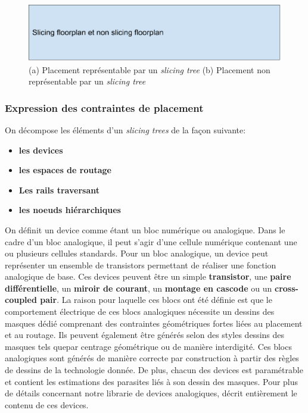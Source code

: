 \begin{figure}[h]
\begin{center}
\includegraphics[height=0.10\textheight]{Figures/10.pdf}
\caption{(a) Placement représentable par un \textit{slicing tree} (b) Placement non représentable par un \textit{slicing tree}}
\label{fig:10}
\end{center}
\end{figure} 
\subsubsection{Expression des contraintes de placement}
On décompose les éléments d'un \textit{slicing trees} de la façon suivante:
\begin{itemize}
\item \textbf{les devices}
\item \textbf{les espaces de routage}
\item \textbf{Les rails traversant}
\item \textbf{les noeuds hiérarchiques}
\end{itemize}

On définit un device comme étant un bloc numérique ou analogique. Dans le cadre d'un bloc analogique, il peut s'agir d'une cellule numérique contenant une ou plusieurs cellules standards. Pour un bloc analogique, un device peut représenter un ensemble de transistors permettant de réaliser une fonction analogique de base. Ces devices peuvent être un simple \textbf{transistor}, une \textbf{paire différentielle}, un \textbf{miroir de courant}, un \textbf{montage en cascode} ou un \textbf{cross-coupled pair}. La raison pour laquelle ces blocs ont été définie est que le comportement électrique de ces blocs analogiques nécessite un dessins des masques dédié comprenant des contraintes géométriques fortes liées au placement et au routage. Ils peuvent également être générés selon des styles dessins des masques tels quepar centrage géométrique ou de manière interdigité. Ces blocs analogiques sont générés de manière correcte par construction à partir des règles de dessins de la technologie donnée. De plus, chacun des devices est paramétrable et contient les estimations des parasites liés à son dessin des masques. Pour plus de détails concernant notre librarie de devices analogiques, \cite{youssef2012} décrit entièrement le contenu de ces devices.

